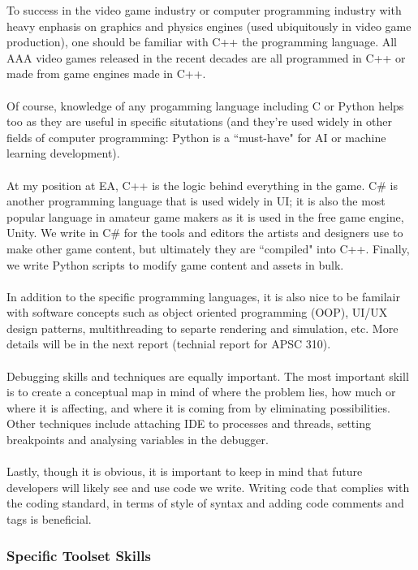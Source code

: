 \documentclass[10pt,letterpaper]{article}
\begin{document}
To success in the video game industry or computer programming industry with heavy enphasis on graphics and physics engines (used ubiquitously in video game production), one should be familiar with C++ the programming language. All AAA video games released in the recent decades are all programmed in C++ or made from game engines made in C++.\\
\\
Of course, knowledge of any progamming language including C or Python helps too as they are useful in specific situtations (and they're used widely in other fields of computer programming: Python is a ``must-have" for AI or machine learning development).\\
\\
At my position at EA, C++ is the logic behind everything in the game. C\# is another programming language that is used widely in UI; it is also the most popular language in amateur game makers as it is used in the free game engine, Unity. We write in C\# for the tools and editors the artists and designers use to make other game content, but ultimately they are ``compiled" into C++. Finally, we write Python scripts to modify game content and assets in bulk.\\
\\
In addition to the specific programming languages, it is also nice to be familair with software concepts such as object oriented programming (OOP), UI/UX design patterns, multithreading to separte rendering and simulation, etc. More details will be in the next report (technial report for APSC 310).\\
\\
Debugging skills and techniques are equally important. The most important skill is to create a conceptual map in mind of where the problem lies, how much or where it is affecting, and where it is coming from by eliminating possibilities. Other techniques include attaching IDE to processes and threads, setting breakpoints and analysing variables in the debugger.\\
\\
Lastly, though it is obvious, it is important to keep in mind that future developers will likely see and use code we write. Writing code that complies with the coding standard, in terms of style of syntax and adding code comments and tags is beneficial.

\subsubsection{Specific Toolset Skills}
\end{document}
